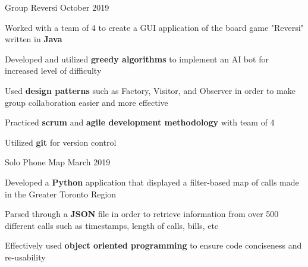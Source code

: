\begin{cventries}
    \cventry
    {Group} %
    {Reversi} %
    {} %
    {October 2019} %
    {
      \begin{cvitems} %
      	\item {Worked with a team of 4 to create a GUI application of the board game "Reversi" written in\textbf{ Java}}
        \item {Developed and utilized \textbf{greedy algorithms} to implement an AI bot for increased level of difficulty} 
        \item {Used \textbf{design patterns} such as Factory, Visitor, and Observer in order to make group collaboration easier and more effective} 
		\item {Practiced \textbf{scrum} and \textbf{agile development methodology} with team of 4}
        \item {Utilized \textbf{git} for version control}
      \end{cvitems}
    }
    \cventry
    {Solo} %
    {Phone Map} %
    {} %
    {March 2019} %
    {
      \begin{cvitems} %
      	\item {Developed a \textbf{Python} application that displayed a filter-based map of calls made in the Greater Toronto Region}
		\item {Parsed through a \textbf{JSON} file in order to retrieve information from over 500 different calls such as timestamps, length of calls, bills, etc}
        \item {Effectively used \textbf{object oriented programming} to ensure code conciseness and re-usability}
      \end{cvitems}
    }
\end{cventries}